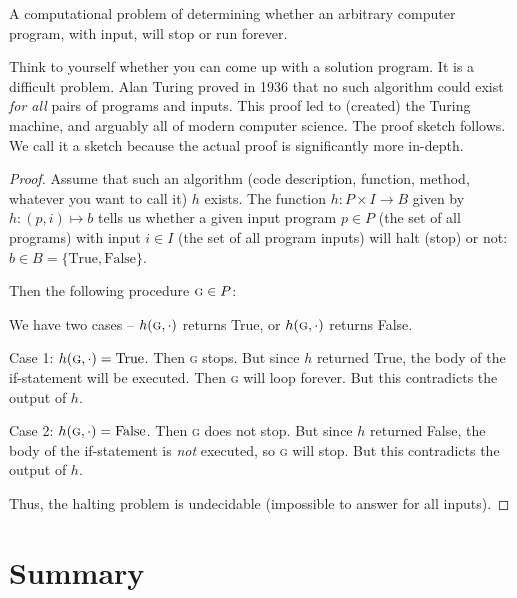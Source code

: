 \documentclass[main.tex]{subfiles}
\begin{document}
\begin{defn}
	A computational problem of determining whether an arbitrary computer program, with input, will stop or run forever.
\end{defn}

Think to yourself whether you can come up with a solution program. It is a difficult problem. Alan Turing proved in 1936 that no such algorithm could exist \textit{for all} pairs of programs and inputs. This proof led to (created) the Turing machine, and arguably all of modern computer science. The proof sketch follows. We call it a sketch because the actual proof is significantly more in-depth.

\begin{proof}
	Assume that such an algorithm (code description, function, method, whatever you want to call it) \(h\) exists. The function \(h : P \times I \rightarrow B\) given by \(h : (p,i) \mapsto b\) tells us whether a given input program \(p \in P\) (the set of all programs) with input \(i \in I\) (the set of all program inputs) will halt (stop) or not: \(b \in B = \{\text{True}, \text{False}\}\).
	
	Then the following procedure \(\textsc{g} \in P\):
	\begin{algorithmic}[1]
				\EndWhile
			\EndIf
		\EndFunction
	\end{algorithmic}
	
	We have two cases -- \(h(\textsc{g},\cdot)\) returns True, or \(h(\textsc{g},\cdot)\) returns False.
	
	Case 1: \(h(\textsc{g},\cdot) = \text{True}\). Then \textsc{g} stops. But since \(h\) returned True, the body of the if-statement will be executed. Then \textsc{g} will loop forever. But this contradicts the output of \(h\).
	
	Case 2: \(h(\textsc{g},\cdot) = \text{False}\). Then \textsc{g} does not stop. But since \(h\) returned False, the body of the if-statement is \textit{not} executed, so \textsc{g} will stop. But this contradicts the output of \(h\).
	
	Thus, the halting problem is undecidable (impossible to answer for all inputs).
\end{proof}


\section{Summary}
\end{document}
